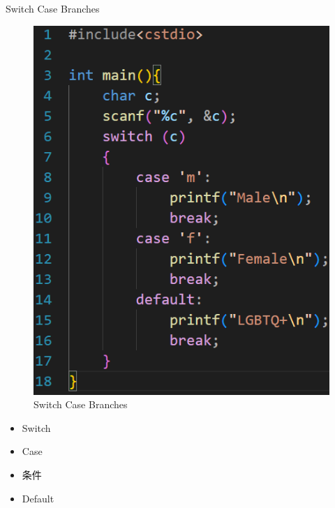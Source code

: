 \documentclass{beamer}
\begin{document}
\begin{frame}{Switch Case Branches}
    \begin{minipage}{0.45\linewidth}
        \begin{figure}
        \centering
        \includegraphics[width=\linewidth]{pic/Switch Case Branches.png}
        \caption{Switch Case Branches}
        \label{fig:Switch_Branch_Branches}
    \end{figure}
    \end{minipage}
    \hspace{1cm}
    \begin{minipage}{0.37\linewidth}
        \begin{itemize}
            \item Switch
            \item Case
            \item 条件
            \item Default
        \end{itemize}
    \end{minipage}
\end{frame}
\end{document}
